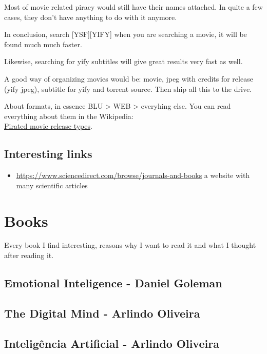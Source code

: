 Most of movie related piracy would still have their names attached. In quite a few cases, they don't have anything to do with it anymore. 

In conclusion, search [YSF][YIFY] when you are searching a movie, it will be found much much faster.

Likewise, searching for yify subtitles will give great results very fast as well.

A good way of organizing movies would be: movie, jpeg with credits for release (yify jpeg), subtitle for yify and torrent source. Then ship all this to the drive.

About formats, in essence BLU > WEB > everyhing else. You can read everything about them in the Wikipedia:\\ \href{https://en.wikipedia.org/wiki/Pirated_movie_release_types}{\uline{Pirated movie release types}}.



\subsection{Interesting links}

\begin{itemize}
    \item \href{https://www.sciencedirect.com/browse/journals-and-books}{\ul{https://www.sciencedirect.com/browse/journals-and-books}} a website with many scientific articles
\end{itemize}


\section{Books}
\par Every book I find interesting, reasons why I want to read it and what I thought after reading it.

\subsection{Emotional Inteligence - Daniel Goleman}

\subsection{The Digital Mind - Arlindo Oliveira}

\subsection{Inteligência Artificial - Arlindo Oliveira}


